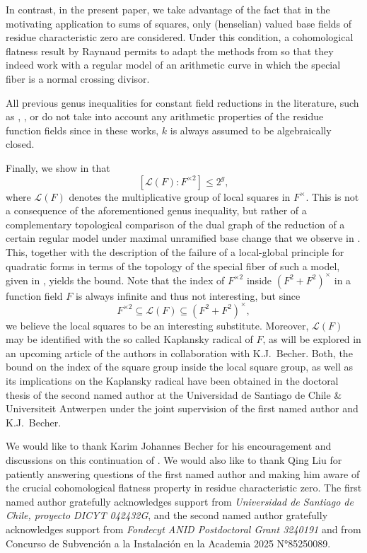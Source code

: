 \documentclass[a4paper,12pt,reqno]{amsart}
\theoremstyle{definition}
\numberwithin{equation}{thm}
\renewcommand{\leq}{\leqslant}
\begin{document}
In contrast,  in the present paper, we take advantage of the fact that in the motivating application to sums of squares, only (henselian) valued base fields of residue characteristic zero are considered. Under this condition, a cohomological flatness result by Raynaud \cite{Ray70} permits to adapt the methods from \cite{BG24} so that they indeed work with a regular model of an arithmetic curve in which the special fiber is a normal crossing divisor. 

 All previous genus inequalities for constant field reductions in the literature, such as \cite{Mathieu}, \cite{Mat87}, or \cite{GMP89} do not take into account any arithmetic properties of the residue function fields since in these works, $k$ is always assumed to be algebraically closed.
 
Finally, we show in  that  $$\left[\mathcal{L}(F): F^{\times 2}\right] \leq 2^g,$$
where $\mathcal{L}(F)$ denotes the multiplicative group of local squares in $F^\times$. This is not a consequence of the aforementioned genus inequality, but rather of a complementary topological comparison of the dual graph of the reduction of a certain regular model under maximal unramified base change that we observe in . This,  together with the description of the failure of a local-global principle for quadratic forms in terms of the topology of the special fiber of such a model, given in \cite{HHK15}, yields the bound.
Note that the index of $F^{\times 2}$ inside $\left(F^2 + F^2\right)^\times$ in a function field $F$ is always infinite and thus not interesting, but since $$F^{\times 2} \subseteq \mathcal{L}(F) \subseteq \left(F^2 + F^2\right)^\times,$$ we believe the local squares to be an interesting substitute. Moreover, $\mathcal{L}(F)$ may be identified with the so called Kaplansky radical of $F$, as will be explored in an upcoming article of the authors in collaboration with K.J.~Becher. Both, the bound on the index of the square group inside the local square group, as well as its implications on the Kaplansky radical have been obtained in the doctoral thesis of the second named author at the Universidad de Santiago de Chile \& Universiteit Antwerpen under the joint supervision of the first named author and K.J.~Becher.


\bigskip

 We would like to thank Karim Johannes Becher for his encouragement and discussions on this continuation of \cite{BG24}. We would also like to thank Qing Liu for patiently answering questions of the first named author and making him aware of the crucial cohomological flatness property in residue characteristic zero. 
 The first named author gratefully acknowledges support from \textit{Universidad de Santiago de Chile, proyecto DICYT 042432G}, and the second named author gratefully acknowledges support from \textit{Fondecyt ANID Postdoctoral Grant 3240191} and from Concurso de Subvenci\'on a la Instalaci\'on en la Academia 2025 N°85250089.
\end{document}
